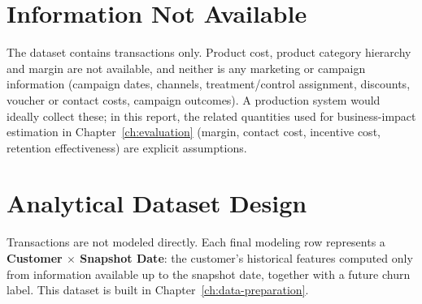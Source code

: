 \section{Information Not Available}
\label{sec:3-6}

The dataset contains transactions only. Product cost, product category hierarchy and margin are not available, and neither is any marketing or campaign information (campaign dates, channels, treatment/control assignment, discounts, voucher or contact costs, campaign outcomes). A production system would ideally collect these; in this report, the related quantities used for business-impact estimation in Chapter~\ref{ch:evaluation} (margin, contact cost, incentive cost, retention effectiveness) are explicit assumptions.

\section{Analytical Dataset Design}
\label{sec:3-7}

Transactions are not modeled directly. Each final modeling row represents a \textbf{Customer $\times$ Snapshot Date}: the customer's historical features computed only from information available up to the snapshot date, together with a future churn label. This dataset is built in Chapter~\ref{ch:data-preparation}.
